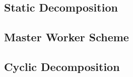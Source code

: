\documentclass{article}
\begin{document}


\newpage
\subsection{Static Decomposition}
\label{sec:static-code}



\newpage
\subsection{Master Worker Scheme}
\label{sec:master-worker-code}



\newpage
\subsection{Cyclic Decomposition}
\label{sec:cyclic-code}


\end{document}
